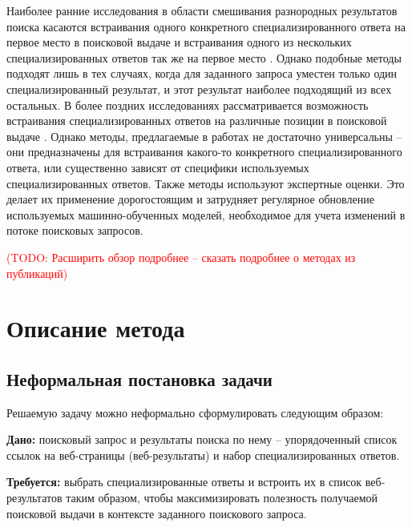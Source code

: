 \documentclass[12pt,a4paper]{report}
\newcommand\note[1]{\textcolor{red}{(#1)}}
\newcommand\todonote[1]{\note{TODO: #1}}
\begin{document}
Наиболее ранние исследования в области смешивания разнородных результатов поиска касаются встраивания одного конкретного специализированного ответа на первое место в поисковой выдаче \cite{Diaz-News, Konig, Li} и встраивания одного из нескольких специализированных ответов так же на первое место \cite{Arguello-VerticalSelection2009, Arguello-VerticalSelection2010, DiazArguello-VerticalSelection}. Однако подобные методы подходят лишь в тех случаях, когда для заданного запроса уместен только один специализированный результат, и этот результат наиболее подходящий из всех остальных. В более поздних исследованиях рассматривается возможность встраивания специализированных ответов на различные позиции в поисковой выдаче \cite{Lefortier-YandexVideo, Ponnuswami, Arguello-CIKM11, Jie-YahooFederationSystem}. 
Однако методы, предлагаемые в работах \cite{Lefortier-YandexVideo, Ponnuswami, Arguello-CIKM11} не достаточно универсальны -- они предназначены для встраивания какого-то конкретного специализированного ответа, или существенно зависят от специфики используемых специализированных ответов.
Также методы \cite{Ponnuswami, Arguello-CIKM11} используют экспертные оценки. Это делает их применение дорогостоящим и затрудняет регулярное обновление используемых машинно-обученных моделей, необходимое для учета изменений в потоке поисковых запросов.

\todonote{Расширить обзор подробнее -- сказать подробнее о методах из публикаций}


\chapter{Описание метода}

\section{Неформальная постановка задачи}

Решаемую задачу можно неформально сформулировать следующим образом:

\vspace{3mm}
\textbf{Дано:} поисковый запрос и результаты поиска по нему -- упорядоченный список ссылок на веб-страницы (веб-результаты) и набор специализированных ответов. 

\textbf{Требуется:} выбрать специализированные ответы и встроить их в список веб-результатов таким образом, чтобы максимизировать полезность получаемой поисковой выдачи в контексте заданного поискового запроса.
\vspace{3mm}
\end{document}
